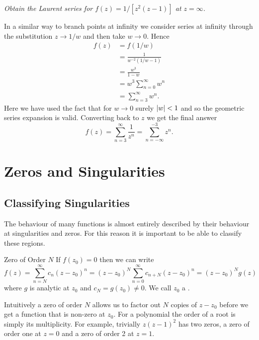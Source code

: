\documentclass{article}
\begin{document}
    \begin{example}
        \emph{Obtain the Laurent series for \(f(z) = 1/[z^2(z -1)]\) at \(z = \infty\).}
        
        In a similar way to branch points at infinity we consider series at infinity through the substitution \(z \to 1/w\) and then take \(w\to 0\).
        Hence
        \begin{align*}
            f(z) &= f(1/w)\\
            &= \frac{1}{w^{-2}(1/w - 1)}\\
            &= \frac{w^3}{1 - w}\\
            &= w^3 \sum_{n=0}^{\infty} w^n\\
            &= \sum_{n=3}^{\infty} w^n.
        \end{align*}
        Here we have used the fact that for \(w\to 0\) surely \(\abs{w} < 1\) and so the geometric series expansion is valid.
        Converting back to \(z\) we get the final answer
        \[f(z) = \sum_{n=3}^{\infty} \frac{1}{z^n} = \sum_{n=-\infty}^{-3}z^n.\]
    \end{example}

    \section{Zeros and Singularities}
    \subsection{Classifying Singularities}
    The behaviour of many functions is almost entirely described by their behaviour at singularities and zeros.
    For this reason it is important to be able to classify these regions.
    
    \begin{definition}{Zero of Order \(N\)}{}
        If \(f(z_0) = 0\) then we can write
        \[f(z) = \sum_{n=N}^{\infty} c_n(z - z_0)^n = (z - z_0)^N\sum_{n=0}^{\infty}c_{n+N}(z - z_0)^n = (z - z_0)^Ng(z)\]
        where \(g\) is analytic at \(z_0\) and \(c_N = g(z_0) \ne 0\).
        We call \(z_0\) a .
    \end{definition}
    Intuitively a zero of order \(N\) allows us to factor out \(N\) copies of \(z - z_0\) before we get a function that is non-zero at \(z_0\).
    For a polynomial the order of a root is simply its multiplicity.
    For example, trivially \(z(z - 1)^2\) has two zeros, a zero of order one at \(z = 0\) and a zero of order 2 at \(z = 1\).
    
\end{document}
